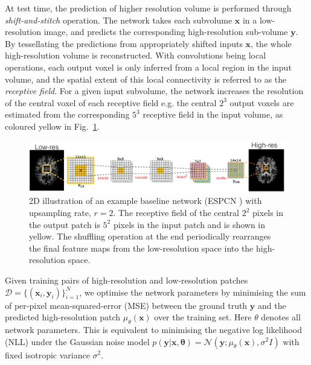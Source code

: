 At test time, the prediction of higher resolution volume is performed through \textit{shift-and-stitch} operation. The network takes each subvolume $\mathbf{x}$ in a low-resolution image, and predicts the corresponding high-resolution sub-volume $\mathbf{y}$. By tessellating the predictions from appropriately shifted inputs $\mathbf{x}$, the whole high-resolution volume is reconstructed. With convolutions being local operations, each output voxel is only inferred from a local region in the input volume, and the spatial extent of this local connectivity is referred to as the \textit{receptive field}. For a given input subvolume, the network increases the resolution of the central voxel of each receptive field e.g. the central $2^3$ output voxels are estimated from the corresponding $5^3$ receptive field in the input volume, as coloured yellow in Fig.~\ref{fig:ESPCN}.

\begin{figure}[t]
	\includegraphics[width=\linewidth]{chapter_3/figures/fig_1_2.png}
	\centering	
	\caption{2D illustration of an example baseline network (ESPCN \cite{shi2016real}) with upsampling rate, $r=2$. The receptive field of the central $2^2$ pixels in the output patch is $5^2$ pixels in the input patch and
		 is shown in yellow. The shuffling operation at the end periodically rearranges the final feature maps from the low-resolution space into the high-resolution space.} 
	\label{fig:ESPCN}
	
\end{figure}


Given training pairs of high-resolution and low-resolution patches $\mathcal{D}=\{(\mathbf{x}_i,\mathbf{y}_i)\}_{i=1}^N$, we optimise the network parameters by minimising the sum of per-pixel mean-squared-error (MSE) between the ground truth $\mathbf{y}$ and the predicted high-resolution patch $\mu_{\theta}(\mathbf{x})$ over the training set. Here $\theta$ denotes all network parameters. This is equivalent to minimising the negative log likelihood (NLL) under the Gaussian noise model $p(\mathbf{y}|\mathbf{x},\mathbf{\theta}) = \mathcal{N}(\mathbf{y}; \mu_{\theta}(\mathbf{x}), \sigma^2I)$ with fixed isotropic variance $\sigma^2$. %


